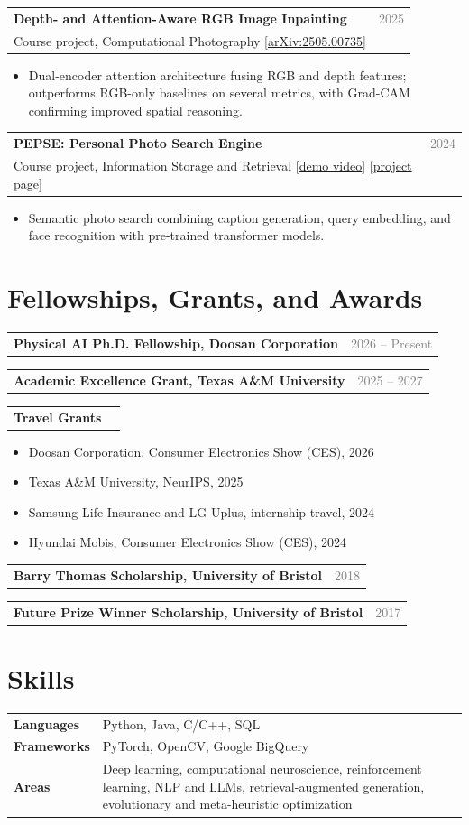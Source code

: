 \documentclass[10pt,letterpaper]{article}
\makeatletter
\newcommand{\entry}[3]{%
  \par\vspace{4pt}%
  \begin{tabularx}{\textwidth}{@{}X@{\hspace{1em}}r@{}}
    \textbf{#1} & \textcolor{gray}{#2}\\
    {#3} & \\
  \end{tabularx}\par\vspace{-2pt}}
\newcommand{\entryone}[2]{%
  \par\vspace{4pt}%
  \begin{tabularx}{\textwidth}{@{}X@{\hspace{1em}}r@{}}
    \textbf{#1} & \textcolor{gray}{#2}\\
  \end{tabularx}\par\vspace{-2pt}}
\makeatother
\begin{document}
\entry{Depth- and Attention-Aware RGB Image Inpainting}{2025}
      {Course project, Computational Photography [\href{https://arxiv.org/abs/2505.00735}{arXiv:2505.00735}]}
\begin{itemize}
  \item Dual-encoder attention architecture fusing RGB and depth features; outperforms RGB-only baselines on several metrics, with Grad-CAM confirming improved spatial reasoning.
\end{itemize}

\entry{PEPSE: Personal Photo Search Engine}{2024}
      {Course project, Information Storage and Retrieval [\href{https://www.youtube.com/watch?v=ZiI4mklxKoY}{demo video}] [\href{https://sites.google.com/tamu.edu/pepse/home}{project page}]}
\begin{itemize}
  \item Semantic photo search combining caption generation, query embedding, and face recognition with pre-trained transformer models.
\end{itemize}

\section{Fellowships, Grants, and Awards}

\entryone{Physical AI Ph.D. Fellowship, Doosan Corporation}{2026 -- Present}
\entryone{Academic Excellence Grant, Texas A\&M University}{2025 -- 2027}
\entryone{Travel Grants}{}
\begin{itemize}
  \item Doosan Corporation, Consumer Electronics Show (CES), 2026
  \item Texas A\&M University, NeurIPS, 2025
  \item Samsung Life Insurance and LG Uplus, internship travel, 2024
  \item Hyundai Mobis, Consumer Electronics Show (CES), 2024
\end{itemize}
\entryone{Barry Thomas Scholarship, University of Bristol}{2018}
\entryone{Future Prize Winner Scholarship, University of Bristol}{2017}

\section{Skills}
\begin{tabularx}{\textwidth}{@{}p{7.5em}X@{}}
  \textbf{Languages} & Python, Java, C/C++, SQL \\
  \textbf{Frameworks} & PyTorch, OpenCV, Google BigQuery \\
  \textbf{Areas} & Deep learning, computational neuroscience, reinforcement learning, NLP and LLMs, retrieval-augmented generation, evolutionary and meta-heuristic optimization \\
\end{tabularx}
\end{document}
